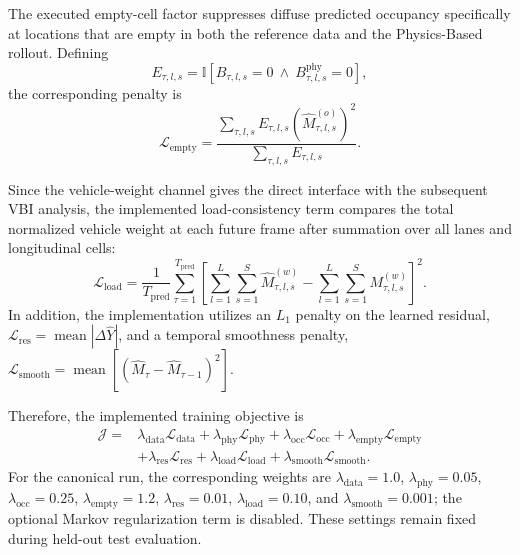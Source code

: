 \documentclass[journal]{IEEEtran}
\begin{document}
The executed empty-cell factor suppresses diffuse predicted occupancy specifically at locations that are empty in both the reference data and the Physics-Based rollout. Defining
\begin{equation}
E_{\tau,l,s}
=
\mathbb{I}\left[
B_{\tau,l,s}=0
\ \land\
B_{\tau,l,s}^{\mathrm{phy}}=0
\right],
\end{equation}
the corresponding penalty is
\begin{equation}
\mathcal{L}_{\mathrm{empty}}
=
\frac{
\sum_{\tau,l,s}
E_{\tau,l,s}
\left(
\widehat{M}_{\tau,l,s}^{(o)}
\right)^2
}{
\sum_{\tau,l,s}E_{\tau,l,s}
}.
\end{equation}

Since the vehicle-weight channel gives the direct interface with the subsequent VBI analysis, the implemented load-consistency term compares the total normalized vehicle weight at each future frame after summation over all lanes and longitudinal cells:
\begin{equation}
\mathcal{L}_{\mathrm{load}}
=
\frac{1}{T_{\mathrm{pred}}}
\sum_{\tau=1}^{T_{\mathrm{pred}}}
\left[
\sum_{l=1}^{L}\sum_{s=1}^{S}
\widehat{M}_{\tau,l,s}^{(w)}
-
\sum_{l=1}^{L}\sum_{s=1}^{S}
M_{\tau,l,s}^{(w)}
\right]^2.
\end{equation}
In addition, the implementation utilizes an $L_1$ penalty on the learned residual, $\mathcal{L}_{\mathrm{res}}=\operatorname{mean}|\Delta\widehat{Y}|$, and a temporal smoothness penalty, $\mathcal{L}_{\mathrm{smooth}}=\operatorname{mean}[(\widehat{M}_{\tau}-\widehat{M}_{\tau-1})^2]$.


Therefore, the implemented training objective is
\begin{equation}
\begin{aligned}
\mathcal{J}
={}&
\lambda_{\mathrm{data}}\mathcal{L}_{\mathrm{data}}
+
\lambda_{\mathrm{phy}}\mathcal{L}_{\mathrm{phy}}
+
\lambda_{\mathrm{occ}}\mathcal{L}_{\mathrm{occ}}
+
\lambda_{\mathrm{empty}}\mathcal{L}_{\mathrm{empty}}
\\
&+
\lambda_{\mathrm{res}}\mathcal{L}_{\mathrm{res}}
+
\lambda_{\mathrm{load}}\mathcal{L}_{\mathrm{load}}
+
\lambda_{\mathrm{smooth}}\mathcal{L}_{\mathrm{smooth}}.
\end{aligned}
\end{equation}
For the canonical run, the corresponding weights are $\lambda_{\mathrm{data}}=1.0$, $\lambda_{\mathrm{phy}}=0.05$, $\lambda_{\mathrm{occ}}=0.25$, $\lambda_{\mathrm{empty}}=1.2$, $\lambda_{\mathrm{res}}=0.01$, $\lambda_{\mathrm{load}}=0.10$, and $\lambda_{\mathrm{smooth}}=0.001$; the optional Markov regularization term is disabled. These settings remain fixed during held-out test evaluation.
\end{document}
